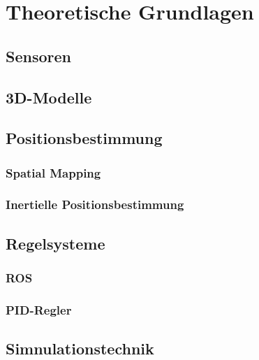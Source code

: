 \chapter{Theoretische Grundlagen}

\section{Sensoren}

\section{3D-Modelle}

\section{Positionsbestimmung}

    \subsection{Spatial Mapping}

    \subsection{Inertielle Positionsbestimmung}

\section{Regelsysteme}

\subsection{ROS}

\subsection{PID-Regler}

\section{Simnulationstechnik}
